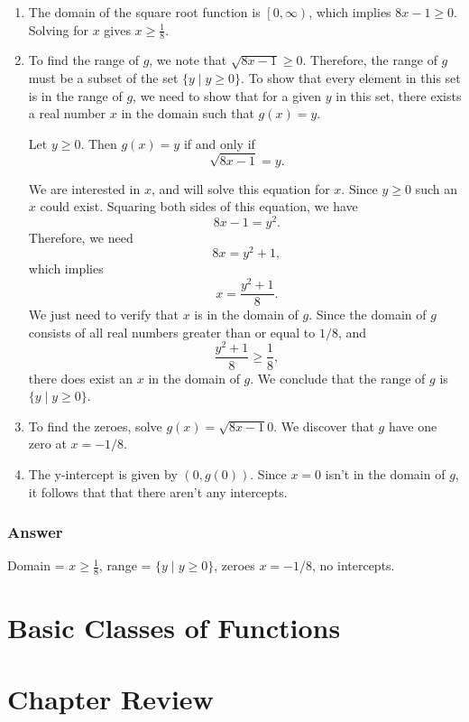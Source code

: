 \documentclass[11pt, letterpaper, oneside]{memoir}
\begin{document}
\begin{enumerate}[label=\roman*]

  \item
    The domain of the square root function is $ \left[ 0, \infty \right) $, which implies $ 8x - 1 \ge 0 $. Solving for $ x $ gives $ x \ge \frac{1}{8} $.

  \item
    To find the range of $ g $, we note that $ \sqrt{8x - 1} \ge 0 $. Therefore, the range of $ g $ must be a subset of the set $ \{y \mid y \ge 0\} $. To show that every element in this set is in the range of $ g $, we need to show that for a given $ y $ in this set, there exists a real number $ x $ in the domain such that $ g(x) = y $.

    Let $ y \ge 0 $. Then $ g(x) = y $ if and only if
    $$ \phantom{.}
    \sqrt{8x - 1} = y
    .$$

    We are interested in $ x $, and will solve this equation for $ x $. Since $ y \ge 0 $ such an $ x $ could exist. Squaring both sides of this equation, we have
    $$ \phantom{.}
    {8x - 1} = y^2
    .$$
    Therefore, we need
    $$ \phantom{.}
    8x = y^2 + 1
    ,$$
    which implies
    $$ \phantom{.}
    x = \frac{y^2 + 1}{8}
    .$$
    We just need to verify that $ x $ is in the domain of $ g $. Since the domain of $ g $ consists of all real numbers greater than or equal to $ 1 / 8 $, and
    $$ \phantom{.}
    \frac{y^2 + 1}{8} \ge \frac{1}{8}
    ,$$
    there does exist an $ x $ in the domain of $ g $. We conclude that the range of $ g $ is $ \{ y \mid y \ge 0 \} $.

  \item
    To find the zeroes, solve $ g(x) = \sqrt{8x - 1}0 $. We discover that $ g $ have one zero at $ x = -1/8 $.

  \item The y-intercept is given by $ (0, g(0)) $. Since $ x = 0 $ isn't in the domain of $ g $, it follows that that there aren't any intercepts.

\end{enumerate}

\subsubsection{Answer}

Domain = $ x \ge \frac{1}{8} $, range = $ \{ y \mid y \ge 0 \} $, zeroes $ x = -1/8 $, no intercepts.









\section{Basic Classes of Functions}



\section{Chapter Review}


\end{document}
